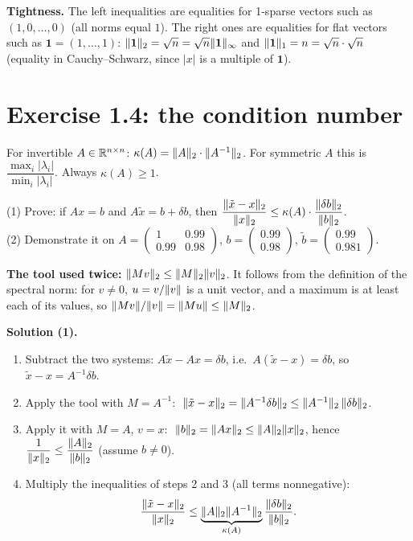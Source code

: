\textbf{Tightness.} The left inequalities are equalities for 1-sparse vectors such as $(1,0,\dots,0)$ (all norms equal $1$).
The right ones are equalities for flat vectors such as $\mathbf 1=(1,\dots,1)$: $\lVert \mathbf 1\rVert_2=\sqrt n=\sqrt n\lVert \mathbf 1\rVert_\infty$
and $\lVert \mathbf1\rVert_1 = n = \sqrt n\cdot\sqrt n$ (equality in Cauchy--Schwarz, since $|x|$ is a multiple of $\mathbf 1$).

\section{Exercise 1.4: the condition number}

\begin{defn}
For invertible $A\in\mathbb{R}^{n\times n}$: $\kappa(A)=\lVert A\rVert_2\cdot\lVert A^{-1}\rVert_2$. For symmetric $A$ this is $\dfrac{\max_i|\lambda_i|}{\min_i|\lambda_i|}$.
Always $\kappa(A)\ge1$.
\end{defn}

\begin{example}
(1) Prove: if $Ax=b$ and $A\tilde x=b+\delta b$, then $\dfrac{\lVert \tilde x-x\rVert_2}{\lVert x\rVert_2}\le\kappa(A)\cdot\dfrac{\lVert \delta b\rVert_2}{\lVert b\rVert_2}$.\\
(2) Demonstrate it on $A=\begin{pmatrix}1&0.99\\0.99&0.98\end{pmatrix}$, $b=\begin{pmatrix}0.99\\0.98\end{pmatrix}$, $\tilde b=\begin{pmatrix}0.99\\0.981\end{pmatrix}$.
\end{example}

\textbf{The tool used twice:} $\lVert Mv\rVert_2\le\lVert M\rVert_2\lVert v\rVert_2$. It follows from the definition of the spectral norm:
for $v\ne0$, $u=v/\lVert v\rVert$ is a unit vector, and a maximum is at least each of its values, so $\lVert Mv\rVert/\lVert v\rVert = \lVert Mu\rVert\le\lVert M\rVert_2$.

\textbf{Solution (1).}
\begin{enumerate}
  \item Subtract the two systems: $A\tilde x - Ax = \delta b$, i.e.\ $A(\tilde x-x)=\delta b$, so $\tilde x-x = A^{-1}\delta b$.
  \item Apply the tool with $M=A^{-1}$: $\;\lVert \tilde x-x\rVert_2 = \lVert A^{-1}\delta b\rVert_2 \le \lVert A^{-1}\rVert_2\,\lVert \delta b\rVert_2$.
  \item Apply it with $M=A$, $v=x$: $\;\lVert b\rVert_2 = \lVert Ax\rVert_2\le\lVert A\rVert_2\lVert x\rVert_2$, hence $\dfrac1{\lVert x\rVert_2}\le\dfrac{\lVert A\rVert_2}{\lVert b\rVert_2}$ (assume $b\ne0$).
  \item Multiply the inequalities of steps 2 and 3 (all terms nonnegative):
        \[ \frac{\lVert \tilde x-x\rVert_2}{\lVert x\rVert_2}\le\underbrace{\lVert A\rVert_2\lVert A^{-1}\rVert_2}_{\kappa(A)}\frac{\lVert \delta b\rVert_2}{\lVert b\rVert_2}. \]
\end{enumerate}

